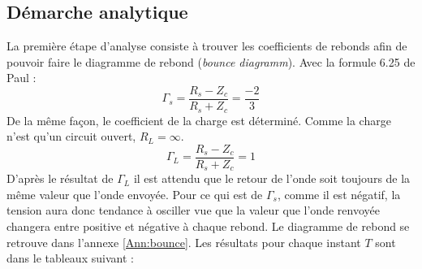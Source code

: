 \subsection{Démarche analytique}
La première étape d'analyse consiste à trouver les coefficients de rebonds afin de pouvoir faire le diagramme de rebond (\textit{bounce diagramm}).
Avec la formule 6.25 de Paul :
\begin{equation}
\Gamma_s = \frac{R_s - Z_c}{R_s + Z_c} = \frac{-2}{3}
\end{equation}
De la même façon, le coefficient de la charge est déterminé.
Comme la charge n'est qu'un circuit ouvert, $R_L = \infty$.
\begin{equation}
\Gamma_L = \frac{R_s - Z_c}{R_s + Z_c} = 1
\end{equation}
D'après le résultat de $\Gamma_L$ il est attendu que le retour de l'onde soit toujours de la même valeur que l'onde envoyée. Pour ce qui est de $\Gamma_s$, comme il est négatif, la tension aura donc tendance à osciller vue que la valeur que l'onde renvoyée changera entre positive et négative à chaque rebond.
Le diagramme de rebond se retrouve dans l'annexe \ref{Ann:bounce}. 
Les résultats pour chaque instant $T$ sont dans le tableaux suivant :






